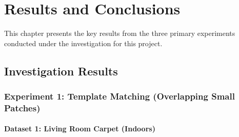 \chapter{Results and Conclusions}

%
%
%

This chapter presents the key results from the three primary experiments conducted under the investigation for this project. 


\section{Investigation Results}

\clearpage
\subsection{Experiment 1: Template Matching (Overlapping Small Patches)}

\subsubsection{Dataset 1: Living Room Carpet (Indoors)}

